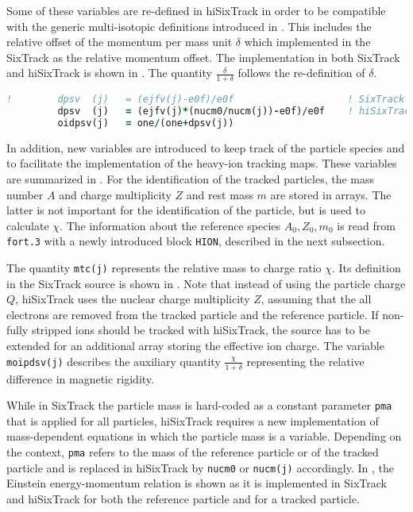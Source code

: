 Some of these variables are re-defined in hiSixTrack in order to be compatible with the generic multi-isotopic definitions introduced in . This includes the relative offset of the momentum per mass unit $\delta$ which implemented in the SixTrack as the relative momentum offset. The implementation in both SixTrack and hiSixTrack is shown in . The quantity $ \frac{\delta}{1+\delta}$ follows the re-definition of $\delta$.

\vspace{0.5cm}
\begin{minipage}{\linewidth}
\begin{lstlisting}[language=Fortran,caption=Definition of $\delta$ in SixTrack and hiSixTrack.,label=lst_delta]
!        dpsv  (j)   = (ejfv(j)-e0f)/e0f                    ! SixTrack
         dpsv  (j)   = (ejfv(j)*(nucm0/nucm(j))-e0f)/e0f    ! hiSixTrack
         oidpsv(j)   = one/(one+dpsv(j))
\end{lstlisting}
\end{minipage}


In addition, new variables are introduced to keep track of the particle species and to facilitate the implementation of the heavy-ion tracking maps. These variables are summarized in . For the identification of the tracked particles, the mass number $A$ and charge multiplicity $Z$ and rest mass $m$ are stored in arrays. The latter is not important for the identification of the particle, but is used to calculate $\chi$. The information about the reference species $A_0,Z_0,m_0$ is read from \lstinline{fort.3} with a newly introduced block \lstinline{HION}, described in the next subsection. 

The quantity \lstinline{mtc(j)} represents the relative mass to charge ratio $\chi$. Its definition in the SixTrack source is shown in . Note that instead of using the particle charge $Q$, hiSixTrack uses the nuclear charge multiplicity $Z$, assuming that the all electrons are removed from the tracked particle and the reference particle. If non-fully stripped ions should be tracked with hiSixTrack, the source has to be extended for an additional array storing the effective ion charge. The variable \lstinline{moipdsv(j)} describes the auxiliary quantity $\frac{\chi}{1+\delta}$ representing the relative difference in magnetic rigidity.

While in SixTrack the particle mass is hard-coded as a constant parameter \lstinline{pma} that is applied for all particles, hiSixTrack requires a new implementation of mass-dependent equations in which the particle mass is a variable. Depending on the context, \lstinline{pma} refers to the mass of the reference particle or of the tracked particle and is replaced in hiSixTrack by \lstinline{nucm0} or \lstinline{nucm(j)} accordingly. In  , the Einstein energy-momentum relation is shown as it is implemented in SixTrack and hiSixTrack for both the reference particle and for a tracked particle.
\vspace{0.5cm}

